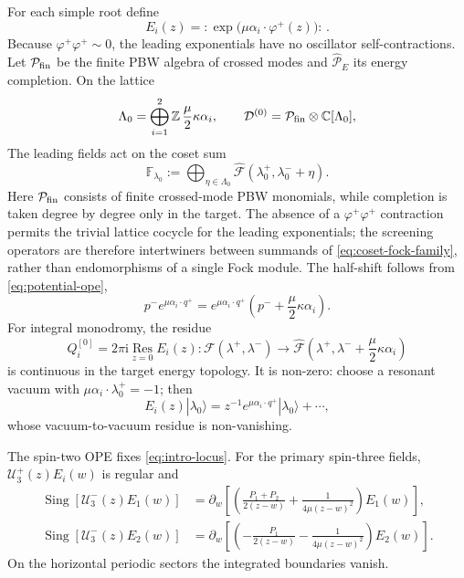 \documentclass[11pt,a4paper]{article}
\numberwithin{equation}{section}
\theoremstyle{remark}
\newcommand{\Sing}{\operatorname{Sing}}
\newcommand{\Res}{\operatorname*{Res}}
\newcommand{\ii}{\mathrm{i}}
\newcommand{\cU}{\mathcal U}
\newcommand{\wideF}{\widehat{\mathcal F}}
\newcommand{\wideP}{\widehat{\mathcal P}}
\begin{document}
For each simple root define
\begin{equation}
 E_i(z)=:\!\exp\!\bigl(\mu\alpha_i\cdot\varphi^+(z)\bigr)\!:\,.
 \label{eq:leading-density}
\end{equation}
Because $\varphi^+\varphi^+\sim0$, the leading exponentials have no oscillator
self-contractions.  Let $\mathcal P_{\rm fin}$ be the finite PBW algebra of crossed modes and
$\wideP_E$ its energy completion.  On the lattice
\begin{equation}
 \Lambda_0=\bigoplus_{i=1}^{2}\mathbb Z\,\frac\mu2\kappa\alpha_i,\qquad
 \mathcal D^{(0)}=\mathcal P_{\rm fin}\otimes\mathbb C[\Lambda_0],
 \label{eq:carrier}
\end{equation}
The leading fields act on the coset sum
\begin{equation}
 \mathbb F_{\lambda_0}:=
 \bigoplus_{\eta\in\Lambda_0}
 \wideF(\lambda_0^+,\lambda_0^-+\eta).
 \label{eq:coset-fock-family}
\end{equation}
Here $\mathcal P_{\rm fin}$ consists of finite crossed-mode PBW monomials, while completion is
taken degree by degree only in the target.  The absence of a $\varphi^+\varphi^+$ contraction
permits the trivial lattice cocycle for the leading exponentials; the screening operators are
therefore intertwiners between summands of \cref{eq:coset-fock-family}, rather than
endomorphisms of a single Fock module.
The half-shift follows from \cref{eq:potential-ope},
\begin{equation}
 p^-e^{\mu\alpha_i\cdot q^+}
 =e^{\mu\alpha_i\cdot q^+}\left(p^-+\frac\mu2\kappa\alpha_i\right).
 \label{eq:half-shift}
\end{equation}
For integral monodromy, the residue
\begin{equation}
 Q_i^{[0]}=2\pi\ii\Res_{z=0}E_i(z)
 :\mathcal F(\lambda^+,\lambda^-)\longrightarrow
 \wideF\!\left(\lambda^+,\lambda^-+\frac\mu2\kappa\alpha_i\right)
 \label{eq:leading-charge}
\end{equation}
is continuous in the target energy topology.  It is non-zero: choose a resonant vacuum with
$\mu\alpha_i\cdot\lambda_0^+=-1$; then
\begin{equation}
 E_i(z)|\lambda_0\rangle
 =z^{-1}e^{\mu\alpha_i\cdot q^+}|\lambda_0\rangle+\cdots,
 \label{eq:leading-nonzero}
\end{equation}
whose vacuum-to-vacuum residue is non-vanishing.

The spin-two OPE fixes \cref{eq:intro-locus}.  For the primary spin-three fields,
$\cU_3^+(z)E_i(w)$ is regular and
\begin{align}
 \Sing[\cU_3^-(z)E_1(w)]
 &=\partial_w\!\left[\left(\frac{P_1+P_2}{2(z-w)}
 +\frac{1}{4\mu(z-w)^2}\right)E_1(w)\right],
 \label{eq:leading-root1}\\
 \Sing[\cU_3^-(z)E_2(w)]
 &=\partial_w\!\left[\left(-\frac{P_1}{2(z-w)}
 -\frac{1}{4\mu(z-w)^2}\right)E_2(w)\right].
 \label{eq:leading-root2}
\end{align}
On the horizontal periodic sectors the integrated boundaries vanish.
\end{document}
